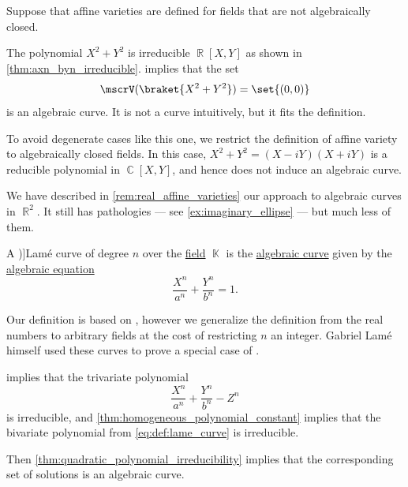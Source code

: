 \begin{example}\label{ex:real_algebraic_curves}
  Suppose that affine varieties are defined for fields that are not algebraically closed.

  The polynomial \( X^2 + Y^2 \) is irreducible \( \BbbR[X, Y] \) as shown in \cref{thm:axn_byn_irreducible}.  implies that the set
  \begin{equation*}
    \mscrV(\braket{ X^2 + Y^2 }) = \set{ (0, 0) }
  \end{equation*}
  is an algebraic curve. It is not a curve intuitively, but it fits the definition.

  To avoid degenerate cases like this one, we restrict the definition of affine variety to algebraically closed fields. In this case, \( X^2 + Y^2 = (X - iY) (X + iY) \) is a reducible polynomial in \( \BbbC[X, Y] \), and hence does not induce an algebraic curve.

  We have described in \cref{rem:real_affine_varieties} our approach to algebraic curves in \( \BbbR^2 \). It still has pathologies --- see \cref{ex:imaginary_ellipse} --- but much less of them.
\end{example}

\begin{definition}\label{def:lame_curve}\mimprovised
  A \term[ru=кривая Ламэ (\cite[179]{Савелов1960ПлоскиеКривые})]{Lam\'e curve} of degree \( n \) over the \hyperref[def:field]{field} \( \BbbK \) is the \hyperref[def:affine_algebraic_set/curve]{algebraic curve} given by the \hyperref[def:polynomial_equation]{algebraic equation}
  \begin{equation}\label{eq:def:lame_curve}
    \frac {X^n} {a^n} + \frac {Y^n} {b^n} = 1.
  \end{equation}
\end{definition}
\begin{comments}
  \item Our definition is based on \cite[179]{Савелов1960ПлоскиеКривые}, however we generalize the definition from the real numbers to arbitrary fields at the cost of restricting \( n \) an integer. Gabriel Lam\'e himself used these curves to prove a special case of .
\end{comments}
\begin{defproof}
   implies that the trivariate polynomial
  \begin{equation*}
    \frac {X^n} {a^n} + \frac {Y^n} {b^n} - Z^n
  \end{equation*}
  is irreducible, and \cref{thm:homogeneous_polynomial_constant} implies that the bivariate polynomial from \eqref{eq:def:lame_curve} is irreducible.

  Then \cref{thm:quadratic_polynomial_irreducibility} implies that the corresponding set of solutions is an algebraic curve.
\end{defproof}

